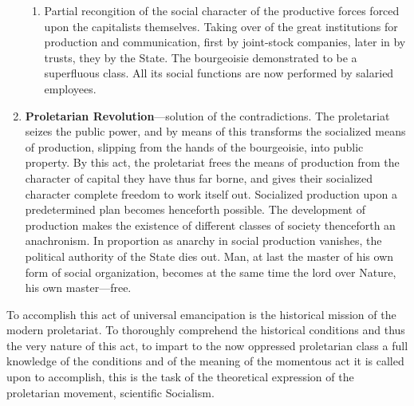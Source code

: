 \begin{enumerate}[label=\textbf{\arabic*.}]
{\begin{enumerate}
{{         reserve-army.} On the other hand, unlimited extension of production,
         also compulsory under competition, for every manufacturer. On both
         sides, unheard-of development of productive forces, excess of supply
         over demand, over-production and products---excess there, of labourers,
         without employment and without means of existence. But these two levers
         of production and of social well-being are unable to work together,
         because the capitalist form of production prevents the productive
         forces from working and the products from circulating, unless they are
         first turned into capital---which their very superabundance prevents.
         The contradiction has grown into an absurdity. \emph{The mode of
         production rises in rebellion against the form of exchange.}
       }
       \item{
         Partial recongition of the social character of the productive forces
         forced upon the capitalists themselves. Taking over of the great
         institutions for production and communication, first by joint-stock
         companies, later in by trusts, they by the State. The bourgeoisie
         demonstrated to be a superfluous class. All its social functions are
         now performed by salaried employees.
       }
    \end{enumerate}
  }
  \item{
    \textbf{Proletarian Revolution}---solution of the contradictions. The
    proletariat seizes the public power, and by means of this transforms the
    socialized means of production, slipping from the hands of the bourgeoisie,
    into public property. By this act, the proletariat frees the means of
    production from the character of capital they have thus far borne, and gives
    their socialized character complete freedom to work itself out. Socialized
    production upon a predetermined plan becomes henceforth possible. The
    development of production makes the existence of different classes of
    society thenceforth an anachronism. In proportion as anarchy in social
    production vanishes, the political authority of the State dies out. Man, at
    last the master of his own form of social organization, becomes at the same
    time the lord over Nature, his own master---free.
  }
\end{enumerate}

To accomplish this act of universal emancipation is the historical mission of
the modern proletariat. To thoroughly comprehend the historical conditions and
thus the very nature of this act, to impart to the now oppressed proletarian
class a full knowledge of the conditions and of the meaning of the momentous act
it is called upon to accomplish, this is the task of the theoretical expression
of the proletarian movement, scientific Socialism.

\printendnotes
